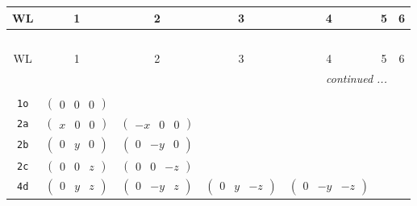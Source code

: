\documentclass[fleqn,9pt,landscape]{jsarticle}
\begin{document}
\begin{center}
\renewcommand{\arraystretch}{1.2}
\begin{longtable}{ccccccc}
 \hline \hline
WL & 1 & 2 & 3 & 4 & 5 & 6 \\ \hline \endfirsthead

\multicolumn{6}{l}{\tablename\ \thetable{}} \\
 \hline \hline
WL & 1 & 2 & 3 & 4 & 5 & 6 \\ \hline \endhead

 \hline \hline
\multicolumn{6}{r}{\footnotesize\it continued ...} \\ \endfoot

 \hline \hline
\multicolumn{6}{r}{} \\ \endlastfoot

{\tt 1o} & $ \begin{pmatrix} 0 & 0 & 0 \end{pmatrix} $ & $  $ & $  $ & $  $ & $  $ & $  $ \\ \hline
{\tt 2a} & $ \begin{pmatrix} x & 0 & 0 \end{pmatrix} $ & $ \begin{pmatrix} - x & 0 & 0 \end{pmatrix} $ & $  $ & $  $ & $  $ & $  $ \\ \hline
{\tt 2b} & $ \begin{pmatrix} 0 & y & 0 \end{pmatrix} $ & $ \begin{pmatrix} 0 & - y & 0 \end{pmatrix} $ & $  $ & $  $ & $  $ & $  $ \\ \hline
{\tt 2c} & $ \begin{pmatrix} 0 & 0 & z \end{pmatrix} $ & $ \begin{pmatrix} 0 & 0 & - z \end{pmatrix} $ & $  $ & $  $ & $  $ & $  $ \\ \hline
{\tt 4d} & $ \begin{pmatrix} 0 & y & z \end{pmatrix} $ & $ \begin{pmatrix} 0 & - y & z \end{pmatrix} $ & $ \begin{pmatrix} 0 & y & - z \end{pmatrix} $ & $ \begin{pmatrix} 0 & - y & - z \end{pmatrix} $ & $  $ & $  $ \\ \hline

\end{longtable}
\end{center}
\end{document}
